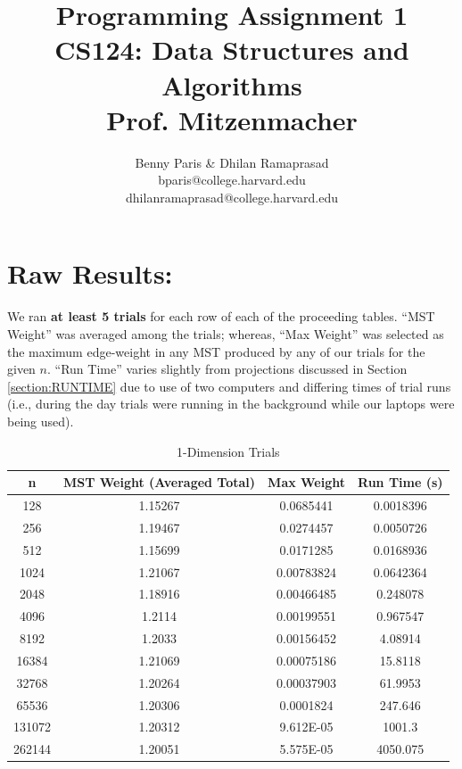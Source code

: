 \documentclass[conference]{styles/acmsiggraph}
\title{\huge Programming Assignment 1 \\ \LARGE {CS124: Data Structures and Algorithms \\ Prof. Mitzenmacher}}
\author{\Large Benny Paris \& Dhilan Ramaprasad \\
bparis@college.harvard.edu\\dhilanramaprasad@college.harvard.edu}
\newcommand{\?}{\stackrel{?}{=}}
\begin{document}
\maketitle

\section{Raw Results:} \label{section:RESULTS}
We ran \textbf{at least 5 trials} for each row of each of the proceeding tables.  \enquote{MST Weight} was averaged among the trials; whereas, \enquote{Max Weight} was selected as the maximum edge-weight in any MST produced by any of our trials for the given $n$. \enquote{Run Time} varies slightly from projections discussed in Section \ref{section:RUNTIME} due to use of two computers and differing times of trial runs (i.e., during the day trials were running in the background while our laptops were being used).
\begin{table}[htbp]
  \centering
  \caption{1-Dimension Trials}
    \begin{tabular}{cccc}
    \toprule
    \textbf{n} & \textbf{MST Weight (Averaged Total)} & \textbf{Max Weight} & \textbf{Run Time (s)} \\
    \midrule
    128   & 1.15267 & 0.0685441 & 0.0018396 \\
    256   & 1.19467 & 0.0274457 & 0.0050726 \\
    512   & 1.15699 & 0.0171285 & 0.0168936 \\
    1024  & 1.21067 & 0.00783824 & 0.0642364 \\
    2048  & 1.18916 & 0.00466485 & 0.248078 \\
    4096  & 1.2114 & 0.00199551 & 0.967547 \\
    8192  & 1.2033 & 0.00156452 & 4.08914 \\
    16384 & 1.21069 & 0.00075186 & 15.8118 \\
    32768 & 1.20264 & 0.00037903 & 61.9953 \\
    65536 & 1.20306 & 0.0001824 & 247.646 \\
    131072 & 1.20312 & 9.612E-05 & 1001.3 \\
    262144 & 1.20051 & 5.575E-05 & 4050.075 \\
    \bottomrule
    \end{tabular}%
  \label{tab:addlabel}%
\end{table}%
\end{document}
